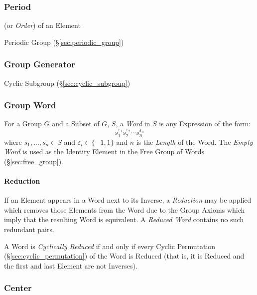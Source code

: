 \subsubsection{Period}\label{sec:period}

(or \emph{Order}) of an Element

Periodic Group (\S\ref{sec:periodic_group})



\subsubsection{Group Generator}\label{sec:group_generator}

Cyclic Subgroup (\S\ref{sec:cyclic_subgroup})



\subsubsection{Group Word}\label{sec:group_word}

For a Group $G$ and a Subset of $G$, $S$, a \emph{Word} in $S$ is any
Expression of the form:
\[
    s_1^{\varepsilon_1}s_2^{\varepsilon_2} \cdots s_n^{\varepsilon_n}
\]
where $s_1,\ldots,s_n \in S$ and $\varepsilon_i \in \{-1, 1\}$ and $n$
is the \emph{Length} of the Word. The \emph{Empty Word} is used as the
Identity Element in the Free Group of Words (\S\ref{sec:free_group}).



\paragraph{Reduction}\label{sec:word_reduction}\hfill

If an Element appears in a Word next to its Inverse, a
\emph{Reduction} may be applied which removes those Elements from the
Word due to the Group Axioms which imply that the resulting Word is
equivalent. A \emph{Reduced Word} contains no such redundant pairs.

A Word is \emph{Cyclically Reduced} if and only if every Cyclic
Permutation (\S\ref{sec:cyclic_permutation}) of the Word is Reduced
(that is, it is Reduced and the first and last Element are not
Inverses).



\subsubsection{Center}\label{sec:group_center}

